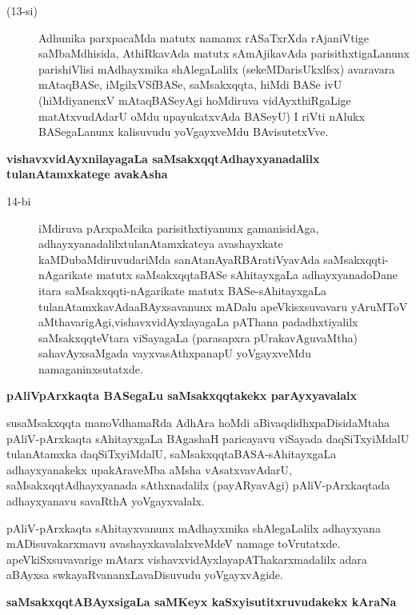 \begin{description}
\item[(13-si)] Adhunika parxpacaMda matutx namamx rASaTxrXda rAjaniVtige saMbaMdhisida, AthiRkavAda matutx sAmAjika\-vAda parisithxtigaLanunx parishiVlisi mAdhayxmika shAlegaLalilx (sekeMDarisUkxlfsx) avaravara mAtaq\-BASe, iMgilxVSfBASe, saMsakxqqta, hiMdi BASe ivU (hiMdiyanenxV mAtaqBASeyAgi hoMdiruva vidAyx\-thiRgaLige matAtxvudAdarU oMdu upayukatxvAda BASeyU) I riVti nAlukx BASegaLanunx kalisuvudu yoVgayxveMdu BAvisutetxVve.
\end{description}

{\medskip
\noindent
{\large\bf vishavxvidAyxnilayagaLa saMsakxqqtAdhayxyanadalilx tulanAtamxkatege avakAsha}}\label{page44}

\begin{description}
\item[14-bi] iMdiruva pArxpaMcika parisithxtiyanunx gamanisidAga, adhayxyanadalilx\break tulanA\-tamxkateya avashayx\-kate kaMDubaMdiruvudariMda sanAtanAyaRBAra\-tiVyavAda saMsakxqqti-nAgarikate matutx saMsakxqqtaBASe sAhitayxgaLa adhayxyana\-doDane itara saMsakxqqti-nAgarikate matutx BASe-sAhitayxgaLa tulanAtamxka\-vAda\break aBAyxsavanunx mADalu apeVkisxsuvavaru yAruMToV aMthavarigAgi,\break vishavxvidAyxlayagaLa pAThana padadhxtiyalilx saMsakxqqteVtara viSayagaLa (parasapxra pUrakavAguvaMtha) sahavAyxsaMgada vayxvasAthxpa\-napU yoVgayxveMdu nama\-ganinxsutatxde.
\end{description}

\eject

{\medskip
\noindent
{\large\bf pAliVpArxkaqta BASegaLu saMsakxqqtakekx parAyxyavalalx}}\label{page44}
\medskip

\noindent
susaMsakxqqta manoVdhamaRda AdhAra hoMdi aBivaqdidhxpaDisidaMtaha pAliV-pArxkaqta sAhitayxgaLa BAga\-shaH paricayavu viSayada daqSiTx\-yiMdalU tulanAtamxka daqSiTx\break\-yiMdalU, saMsakxqqtaBASA-sAhitayxgaLa adhayx\-yanakekx upakAraveMba aMsha vAsatxva\-vAdarU, saMsakxqqtAdhayxyanada sAthxnadalilx (payARyavAgi) pAliV-\-pArxkaqtada adhayx\-yanavu savaRthA yoVgayxvalalx.


pAliV-pArxkaqta sAhitayxvanunx mAdhayxmika shAlegaLalilx adhayxyana mADisuva\break \hbox{karxmavu} avashayxka\-valalx\-veMdeV namage toVrutatxde. apeVkiSxsuvavarige mAtarx vishavx\-vidAyx\-layapAThakarxmadalilx adara aBAyxsa swkayaRvananxLa\-vaDisu\-vudu yoVgayxvAgide.

{\bigskip
\noindent
{\large\bf saMsakxqqtABAyxsigaLa saMKeyx kaSxyisutitxruvudakekx kAraNa}}\label{page45}

